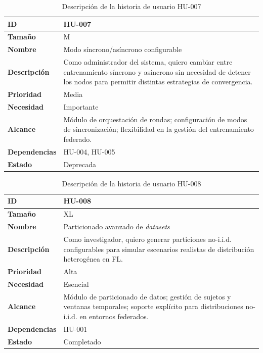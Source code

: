 \documentclass{report}
\begin{document}
\begin{table}[H]
\centering
\caption{Descripción de la historia de usuario HU-007}
\label{tab:hu007}
\begin{tabular}{|l|p{12cm}|}
\hline
\textbf{ID} & HU-007 \\ \hline
\textbf{Tamaño} & M \\ \hline
\textbf{Nombre} & Modo síncrono/asíncrono configurable \\ \hline
\textbf{Descripción} & 
Como administrador del sistema, quiero cambiar entre entrenamiento síncrono y asíncrono sin necesidad de detener los nodos para permitir distintas estrategias de convergencia. \\ \hline
\textbf{Prioridad} & Media \\ \hline
\textbf{Necesidad} & Importante \\ \hline
\textbf{Alcance} & Módulo de orquestación de rondas; configuración de modos de sincronización; flexibilidad en la gestión del entrenamiento federado. \\ \hline
\textbf{Dependencias} & HU-004, HU-005 \\ \hline
\textbf{Estado} & Deprecada \\ \hline
\end{tabular}
\end{table}



\begin{table}[H]
\centering
\caption{Descripción de la historia de usuario HU-008}
\label{tab:hu008}
\begin{tabular}{|l|p{12cm}|}
\hline
\textbf{ID} & HU-008 \\ \hline
\textbf{Tamaño} & XL \\ \hline
\textbf{Nombre} & Particionado avanzado de \textit{datasets} \\ \hline
\textbf{Descripción} & 
Como investigador, quiero generar particiones no-i.i.d. configurables para simular escenarios realistas de distribución heterogénea en FL. \\ \hline
\textbf{Prioridad} & Alta \\ \hline
\textbf{Necesidad} & Esencial \\ \hline
\textbf{Alcance} & Módulo de particionado de datos; gestión de sujetos y ventanas temporales; soporte explícito para distribuciones no-i.i.d. en entornos federados. \\ \hline
\textbf{Dependencias} & HU-001 \\ \hline
\textbf{Estado} & Completado \\ \hline
\end{tabular}
\end{table}
\end{document}
